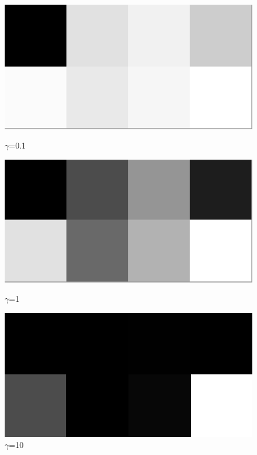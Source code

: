 \documentclass[course=erap]{aspdoc}
\begin{document}
\begin{figure}[h]
\begin{minipage}{0.3\textwidth}
\centering
\includegraphics[width=\textwidth]{Bilder/gamma0.1.pgm.png}
\caption{$\gamma$=0.1}
\end{minipage}
\hfill
\begin{minipage}{0.3\textwidth}
\centering
\includegraphics[width=\textwidth]{Bilder/gamma1.pgm.png}
\caption{$\gamma$=1}
\end{minipage}
\hfill
\begin{minipage}{0.3\textwidth}
\centering
\includegraphics[width=\textwidth]{Bilder/gamma10.pgm.png}
\caption{$\gamma$=10}
\end{minipage}
\end{figure}
\end{document}
